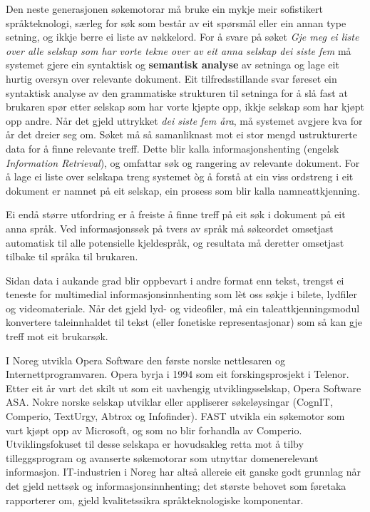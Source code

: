 \begin{multicols}{2}
Den neste generasjonen søkemotorar må bruke ein mykje meir sofistikert språkteknologi, særleg for søk som består av eit spørsmål eller ein annan type setning, og ikkje berre ei liste av nøkkelord. For å svare på søket \textit{Gje meg ei liste over alle selskap som har vorte tekne over av eit anna selskap dei siste fem} må systemet gjere ein syntaktisk og \textbf{semantisk analyse} av setninga og lage eit hurtig oversyn over relevante dokument. Eit tilfredsstillande svar føreset ein syntaktisk analyse av den grammatiske strukturen til setninga for å slå fast at brukaren spør etter selskap som har vorte kjøpte opp, ikkje selskap som har kjøpt opp andre. Når det gjeld uttrykket \textit{dei siste fem åra}, må systemet avgjere kva for år det dreier seg om. Søket må så samanliknast mot ei stor mengd ustrukturerte data for å finne relevante treff. Dette blir kalla informasjonshenting (engelsk \textit{Information Retrieval}), og omfattar søk og rangering av relevante dokument. For å lage ei liste over selskapa treng systemet òg å forstå at ein viss ordstreng i eit dokument er namnet på eit selskap, ein prosess som blir kalla namneattkjenning. 

Ei endå større utfordring er å freiste å finne treff på eit søk i dokument på eit anna språk. Ved informasjonssøk på tvers av språk må søkeordet omsetjast automatisk til alle potensielle kjeldespråk, og resultata må deretter omsetjast tilbake til språka til brukaren. 


Sidan data i aukande grad blir oppbevart i andre format enn tekst,
trengst ei teneste for multimedial informasjonsinnhenting som lèt oss
søkje i bilete, lydfiler og videomateriale. Når det gjeld lyd- og
videofiler, må ein taleattkjenningsmodul konvertere taleinnhaldet til
tekst (eller fonetiske representasjonar) som så kan gje treff mot eit
brukarsøk. 

I Noreg utvikla Opera Software den første norske nettlesaren og Internettprogramvaren. Opera byrja i 1994 som eit forskingsprosjekt i Telenor. 
Etter eit år vart det skilt ut som eit uavhengig utviklingsselskap, Opera Software ASA. Nokre norske selskap utviklar eller appliserer søkeløysingar (CognIT, Comperio, TextUrgy, Abtrox og Infofinder). 
FAST utvikla ein søkemotor som vart kjøpt opp av Microsoft, og som no blir forhandla av Comperio. 
Utviklingsfokuset til desse selskapa er hovudsakleg retta mot å tilby tilleggsprogram og avanserte søkemotorar som utnyttar domenerelevant informasjon. 
IT-industrien i Noreg har altså allereie eit ganske godt grunnlag når det gjeld nettsøk og informasjonsinnhenting; det største behovet som føretaka rapporterer om, gjeld kvalitetssikra språkteknologiske komponentar.


\end{multicols}
